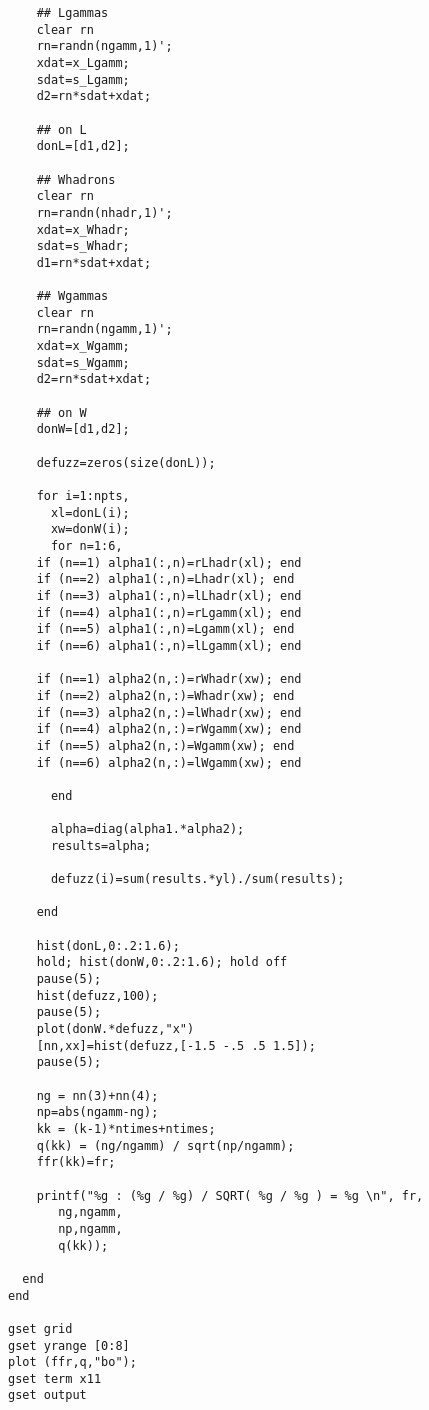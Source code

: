 \documentclass[10pt,a4paper]{article}
\begin{document}
\begin{verbatim}
    ## Lgammas
    clear rn
    rn=randn(ngamm,1)';
    xdat=x_Lgamm;
    sdat=s_Lgamm;
    d2=rn*sdat+xdat;
    
    ## on L
    donL=[d1,d2];

    ## Whadrons
    clear rn
    rn=randn(nhadr,1)';
    xdat=x_Whadr;
    sdat=s_Whadr;
    d1=rn*sdat+xdat;
    
    ## Wgammas
    clear rn
    rn=randn(ngamm,1)';
    xdat=x_Wgamm;
    sdat=s_Wgamm;
    d2=rn*sdat+xdat;
    
    ## on W
    donW=[d1,d2];

    defuzz=zeros(size(donL));

    for i=1:npts,
      xl=donL(i);
      xw=donW(i);
      for n=1:6,
	if (n==1) alpha1(:,n)=rLhadr(xl); end
	if (n==2) alpha1(:,n)=Lhadr(xl); end
	if (n==3) alpha1(:,n)=lLhadr(xl); end
	if (n==4) alpha1(:,n)=rLgamm(xl); end
	if (n==5) alpha1(:,n)=Lgamm(xl); end
	if (n==6) alpha1(:,n)=lLgamm(xl); end

	if (n==1) alpha2(n,:)=rWhadr(xw); end
	if (n==2) alpha2(n,:)=Whadr(xw); end
	if (n==3) alpha2(n,:)=lWhadr(xw); end
	if (n==4) alpha2(n,:)=rWgamm(xw); end
	if (n==5) alpha2(n,:)=Wgamm(xw); end
	if (n==6) alpha2(n,:)=lWgamm(xw); end

      end
      
      alpha=diag(alpha1.*alpha2);
      results=alpha;

      defuzz(i)=sum(results.*yl)./sum(results);

    end
    
    hist(donL,0:.2:1.6);
    hold; hist(donW,0:.2:1.6); hold off
    pause(5);
    hist(defuzz,100);
    pause(5);
    plot(donW.*defuzz,"x")
    [nn,xx]=hist(defuzz,[-1.5 -.5 .5 1.5]);
    pause(5);

    ng = nn(3)+nn(4);
    np=abs(ngamm-ng);
    kk = (k-1)*ntimes+ntimes;
    q(kk) = (ng/ngamm) / sqrt(np/ngamm);
    ffr(kk)=fr;

    printf("%g : (%g / %g) / SQRT( %g / %g ) = %g \n", fr,
	   ng,ngamm, 
	   np,ngamm, 
	   q(kk));

  end
end

gset grid
gset yrange [0:8]
plot (ffr,q,"bo");
gset term x11
gset output


\end{verbatim}
\normalsize

\rm
\newpage\tableofcontents
\end{document}
